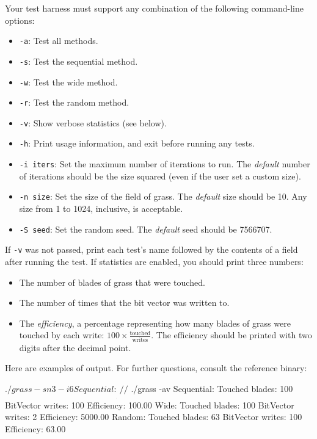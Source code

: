 \documentclass[11pt]{article}
\begin{document}
Your test harness must support any combination of the following command-line options:

\begin{itemize}
    \item \texttt{-a}: Test all methods.
    \item \texttt{-s}: Test the sequential method.
    \item \texttt{-w}: Test the wide method.
    \item \texttt{-r}: Test the random method.
    \item \texttt{-v}: Show verbose statistics (see below).
    \item \texttt{-h}: Print usage information, and exit before running any tests.
    \item \texttt{-i iters}: Set the maximum number of iterations to run. The \emph{default} number of iterations should be the size squared (even if the user set a custom size).
    \item \texttt{-n size}: Set the size of the field of grass. The \emph{default} size should be 10. Any size from 1 to 1024, inclusive, is acceptable.
    \item \texttt{-S seed}: Set the random seed. The \emph{default} seed should be 7566707.
\end{itemize}

If \texttt{-v} was not passed, print each test's name followed by the contents of a field after running the test. If statistics are enabled, you should print three numbers:

\begin{itemize}
    \item The number of blades of grass that were touched.
    \item The number of times that the bit vector was written to.
    \item The \emph{efficiency}, a percentage representing how many blades of grass were touched by each write: $100 \times \frac{\text{touched}}{\text{writes}}$. The efficiency should be printed with two digits after the decimal point.
\end{itemize}

Here are examples of output. For further questions, consult the reference binary:

\begin{shlisting}{}
$ ./grass -sn 3 -i 6
Sequential:
___
___
///
$ ./grass -av
Sequential:
  Touched blades:         100
  BitVector writes:       100
  Efficiency:             100.00%
Wide:
  Touched blades:         100
  BitVector writes:         2
  Efficiency:            5000.00%
Random:
  Touched blades:          63
  BitVector writes:       100
  Efficiency:              63.00%
\end{shlisting}
\end{document}
